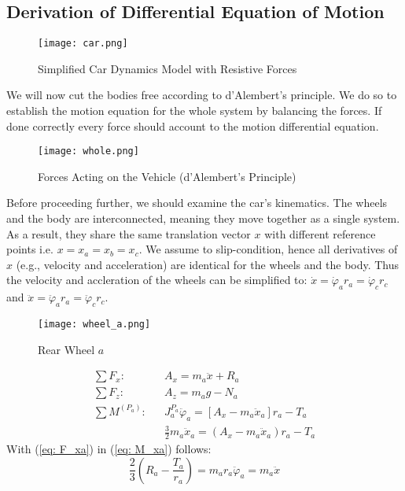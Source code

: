 \subsection*{Derivation of Differential Equation of Motion}
\begin{figure}[H]
	\begin{center}
		\texttt{[image: car.png]}
	\end{center}
	\caption{Simplified Car Dynamics Model with Resistive Forces}
\end{figure}
We will now cut the bodies free according to d'Alembert's principle. We do so to establish the motion equation for the whole system by balancing the forces. If done correctly every force should account to the motion differential equation.
\begin{figure}[H]
	\begin{center}
		\texttt{[image: whole.png]}
	\end{center}
	\caption{Forces Acting on the Vehicle (d'Alembert's Principle)}
\end{figure}
Before proceeding further, we should examine the car's kinematics. The wheels and the body are interconnected, meaning they move together as a single system. As a result, they share the same translation vector $x$ with different reference points i.e. $x=x_a=x_b=x_c$. We assume to slip-condition, hence all derivatives of $x$ (e.g., velocity and acceleration) are identical for the wheels and the body. Thus the velocity and accleration of the wheels can be simplified to: $\dot x = \dot\varphi_ar_a = \dot\varphi_cr_c$ and $\ddot x = \ddot\varphi_ar_a = \ddot\varphi_cr_c$.
\begin{multicols}{2}
	\begin{figure}[H]
		\begin{center}
			\texttt{[image: wheel\_a.png]}	
		\end{center}
		\caption{Rear Wheel $a$}
	\end{figure}
	\begin{align} \label{eq: F_xa}
     	\sum F_x:&& A_x = m_a\ddot x+R_a\\ \label{eq: F_za}
    	\sum F_z: && A_z = m_a g - N_a \\ \nonumber
	    \sum M^{\left(P_a\right)}: &&
    	J_a^{P_a}\ddot\varphi_a = \left[A_x-m_a\ddot x_a \right]r_a-T_a\\ \label{eq: M_xa}
    	&& \frac{3}{2}m_a\ddot x_a = (A_x-m_a\ddot x_a)r_a - T_a
	\end{align}
	With (\ref{eq: F_xa}) in (\ref{eq: M_xa}) follows: %
	\begin{equation}
	    \frac{2}{3}\left(R_a - \frac{T_a}{r_a} \right) = m_a r_a\ddot \varphi_a = m_a\ddot x
    	\label{eq: m1x1}
	\end{equation}
\end{multicols}
